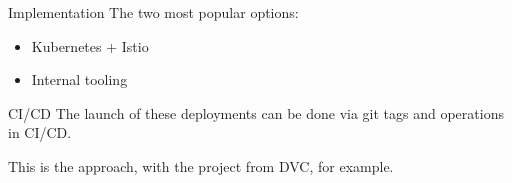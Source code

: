 \begin{frame}{Implementation}
  The two most popular options:
  \begin{itemize}
    \item Kubernetes + Istio
    \item Internal tooling
  \end{itemize}
\end{frame}

\begin{frame}{CI/CD}
  The launch of these deployments can be done via git tags and operations in CI/CD.

  This is the  approach, with the  project from DVC, for example.
\end{frame}
